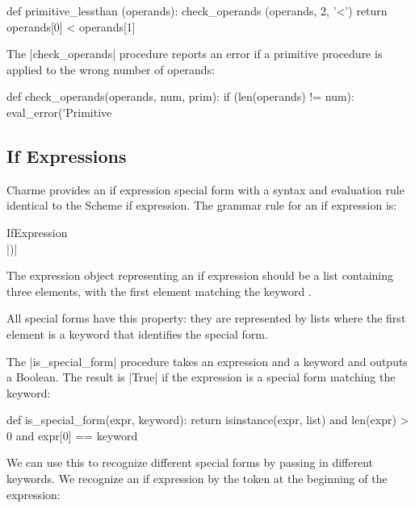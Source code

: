 \begin{pythoncode}    
def primitive_lessthan (operands):
    check_operands (operands, 2, '<')
    return operands[0] < operands[1]
\end{pythoncode}

The \pycode|check_operands| procedure reports an error if a primitive procedure is applied to the wrong number of operands:
\begin{pythoncode}
def check_operands(operands, num, prim):
    if (len(operands) != num):
       eval_error('Primitive %
\end{pythoncode}

\subsection{If Expressions}

Charme provides an if expression special form with a syntax and evaluation rule identical to the Scheme if expression.  The grammar rule for an if expression is:
\begin{schemeregion}
\begin{bnfgrammarm}{IfExpression}
\> \> \> \\
\> \> \> \scheme|)|\\
\end{bnfgrammarm}
\end{schemeregion}
The expression object representing an if expression should be a list containing three elements, with the first element matching the keyword .

All special forms have this property: they are represented by lists where the first element is a keyword that identifies the special form.  

The \pycode|is_special_form| procedure takes an expression and a keyword and outputs a Boolean.  The result is \pycode|True| if the expression is a special form matching the keyword:
\begin{pythoncode}
def is_special_form(expr, keyword):
    return isinstance(expr, list) and len(expr) > 0 and expr[0] == keyword
\end{pythoncode}

We can use this to recognize different special forms by passing in different keywords.  We recognize an if expression by the  token at the beginning of the expression:

